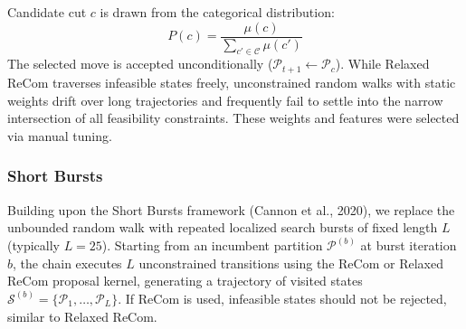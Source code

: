 \documentclass{article}
\begin{document}
Candidate cut $c$ is drawn from the categorical distribution:
\begin{equation}
P(c) = \frac{\mu(c)}{\sum_{c' \in \mathcal{C}} \mu(c')}
\end{equation}
The selected move is accepted unconditionally ($\mathcal{P}_{t+1} \leftarrow \mathcal{P}_c$). While Relaxed ReCom traverses infeasible states freely, unconstrained random walks with static weights drift over long trajectories and frequently fail to settle into the narrow intersection of all feasibility constraints. These weights and features were selected via manual tuning. 

\subsubsection{Short Bursts}
Building upon the Short Bursts framework (Cannon et al., 2020), we replace the unbounded random walk with repeated localized search bursts of fixed length $L$ (typically $L = 25$). Starting from an incumbent partition $\mathcal{P}^{(b)}$ at burst iteration $b$, the chain executes $L$ unconstrained transitions using the ReCom or Relaxed ReCom proposal kernel, generating a trajectory of visited states $\mathcal{S}^{(b)} = \{\mathcal{P}_1, \dots, \mathcal{P}_L\}$. If ReCom is used, infeasible states should not be rejected, similar to Relaxed ReCom.
\end{document}
